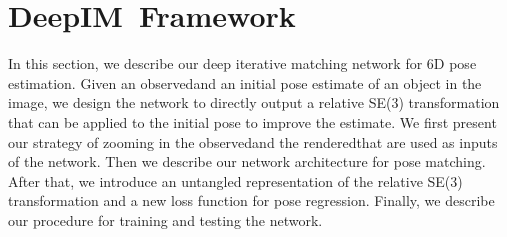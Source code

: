 \documentclass[twocolumn]{svjour3}
\newcommand{\TODO}[1]{\textcolor{red}{TODO:#1}}
\newcommand{\old}[1]{\textcolor{blue}{Old:#1}}
\newcommand{\new}[1]{\textcolor{red}{New:#1}}
\newcommand{\dimnet}[0]{DeepIM}
\newcommand{\xreal}[0]{\mathbf{x}_{\text{obs}}}
\newcommand{\xrend}[0]{\mathbf{x}_{\text{rend}}}
\newcommand{\rend}[0]{rendered}
\newcommand{\real}[0]{observed}
\newcommand{\pose}[0]{\mathbf{p}}
\newcommand{\dpose}[0]{\mathbf{\Delta{p}}}
\newcommand{\ddd}[1]{\textcolor{red}{Dieter:#1}}
\begin{document}

\section{\dimnet\ Framework}



In this section, we describe our deep iterative matching network for 6D pose estimation. Given an \real\image and an initial pose estimate of an object in the image, we design the network to directly output a relative SE(3) transformation that can be applied to the initial pose to improve the estimate. We first present our strategy of zooming in the \real\image and the \rend\image that are used as inputs of the network. Then we describe our network architecture for pose matching. After that, we introduce an untangled representation of the relative SE(3) transformation and a new loss function for pose regression. Finally, we describe our procedure for training and testing the network.


\end{document}
